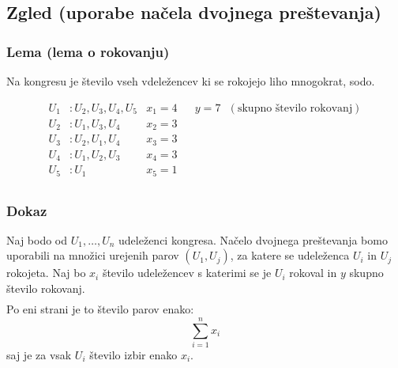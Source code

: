 \begin{center}
\end{center}


\subsection{Zgled (uporabe načela dvojnega preštevanja)}

\subsubsection{Lema (lema o rokovanju)}
Na kongresu je število vseh vdeležencev ki se rokojejo liho mnogokrat, sodo. \\

\begin{center}
\end{center}
\begin{align*}
    U_1&: U_2, U_3, U_4, U_5 & x_1 = 4 && y = 7 \text{ }(\text{skupno število rokovanj})\\ 
    U_2&: U_1, U_3, U_4      & x_2 = 3 \\
    U_3&: U_2, U_1, U_4      & x_3 = 3 \\
    U_4&: U_1, U_2, U_3      & x_4 = 3 \\
    U_5&: U_1                & x_5 = 1 \\
\end{align*}


\subsubsection{Dokaz}
Naj bodo od $U_1, \dots, U_n$ udeleženci kongresa. Načelo dvojnega preštevanja bomo uporabili na množici urejenih parov $(U_1, U_j)$, za katere se udeleženca $U_i$ in $U_j$ rokojeta. Naj bo $x_i$ število udeležencev s katerimi se je $U_i$ rokoval in $y$ skupno število rokovanj.
\begin{align*}
\end{align*}
Po eni strani je to število parov enako:
$$
\sum_{i = 1}^{n} x_i
$$
saj je za vsak $U_i$ število izbir enako $x_i$. \\

